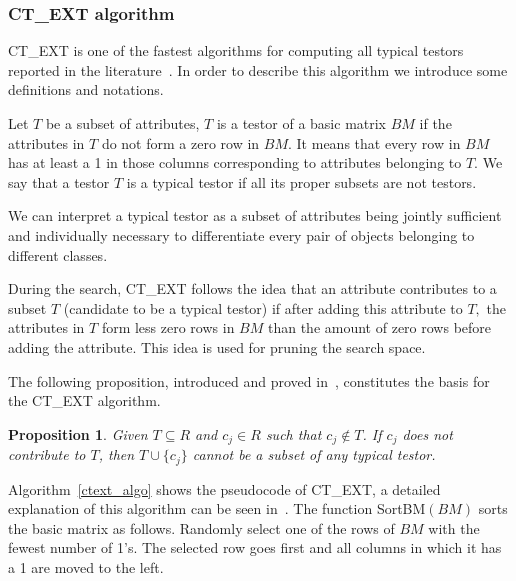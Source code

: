 \documentclass[authoryear,11pt]{elsarticle}
\newtheorem{proposition}{Proposition}
\begin{document}
\subsubsection{CT\_EXT algorithm}
	CT\_EXT is one of the fastest algorithms for computing all typical testors reported in the 
	literature~\citep{Sanchez07,Sanchez10,Piza14}. In order to describe this algorithm we 
	introduce some definitions and notations.	
	
	Let $T$ be a subset of attributes, $T$ is a testor of a basic matrix $BM$ if the attributes in $T$ do 
	not form a zero row 	in $BM$. It means that every row in $BM$ has at least a 1 in those columns corresponding 
	to attributes belonging to $T$. We say that a testor $T$ is a typical testor if all its proper subsets 
	are not	testors.
	
	We can interpret a typical testor as a subset of attributes being jointly sufficient and individually
	necessary to differentiate every pair of objects belonging to different classes.
	
	During the search, CT\_EXT follows the idea that an attribute contributes to a subset $T$ (candidate to 
	be a typical testor) if after adding this attribute to $T,$ the attributes in $T$ form less zero rows 
	in $BM$ than the amount of zero rows before adding the attribute. This idea is used for pruning the search
	space.
	
	The following proposition, introduced and proved in~\citep{Sanchez07}, constitutes the basis for the CT\_EXT
	algorithm.
	
	\begin{proposition}\label{prop1} 
	Given $T \subseteq R$ and $c_j \in R$ such that $c_j \notin T$. If $c_j$ 
	does not contribute to $T$, then $T\cup\{c_j\}$ cannot be a subset of any typical testor.
	\end{proposition}
	
	Algorithm~\ref{ctext_algo} shows the pseudocode of CT\_EXT, a detailed explanation of
	this algorithm can be seen in~\citep{Sanchez07}. The function SortBM$(BM)$ sorts the basic matrix as follows.
	Randomly select one of the rows of $BM$ with the fewest number of 1's. The selected row goes first and
	all columns in which it has a 1 are moved to the left.
	
\end{document}

